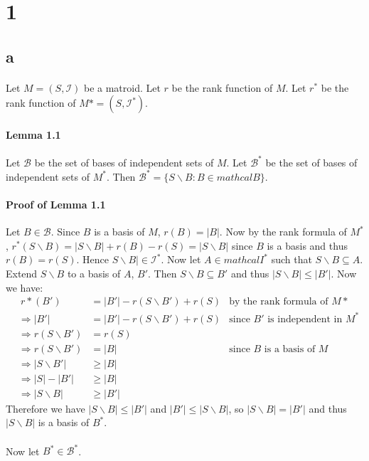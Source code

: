 \documentclass[letterpaper,12pt,oneside,onecolumn]{report}
\begin{document}
\section*{1}
\subsection*{a}
\paragraph{}
Let $M=(S,\mathcal{I})$ be a matroid. Let $r$ be the rank function of $M$. Let $r^*$ be the rank function of $M* = (S, \mathcal{I}^*)$.
\paragraph{Lemma 1.1}
Let $\mathcal{B}$ be the set of bases of independent sets of $M$. Let $\mathcal{B}^*$ be the set of bases of independent sets of $M^*$. Then $\mathcal{B}^* = \{S\backslash B : B \in mathcal{B}\}$.
\paragraph{Proof of Lemma 1.1}
Let $B \in \mathcal{B}$. Since $B$ is a basis of $M$, $r(B) = |B|$. Now by the rank formula of $M^*$, $r^*(S\backslash B) = |S \backslash B| + r(B) - r(S) = |S \backslash B|$ since $B$ is a basis and thus $r(B) = r(S)$. Hence $S \backslash B| \in \mathcal{I}^*$. Now let $A \in mathcal{I}^*$ such that $S\backslash B \subseteq A$. Extend $S\backslash B$ to a basis of $A$, $B'$. Then $S\backslash B \subseteq B'$ and thus $|S\backslash B| \leq |B'|$. Now we have: 
\begin{align*}
&\ r*(B') &= |B'| - r(S\backslash B') + r(S) &\text{by the rank formula of $M*$}\\
&\Rightarrow |B'| &= |B'| - r(S\backslash B') + r(S) &\text{since $B'$ is independent in $M^*$}\\
&\Rightarrow r(S\backslash B') &= r(S) \\
&\Rightarrow r(S\backslash B') &= |B| &\text{since $B$ is a basis of $M$}\\
&\Rightarrow |S\backslash B'| &\geq |B| \\
&\Rightarrow |S| - |B'| &\geq |B| \\
&\Rightarrow |S\backslash B| &\geq |B'|
\end{align*}
Therefore we have $|S\backslash B| \leq |B'|$ and $|B'| \leq |S\backslash B|$, so $|S\backslash B| = |B'|$ and thus $|S\backslash B|$ is a basis of $B^*$.\
\paragraph{}
Now let $B^* \in \mathcal{B}^*$.
\end{document}
